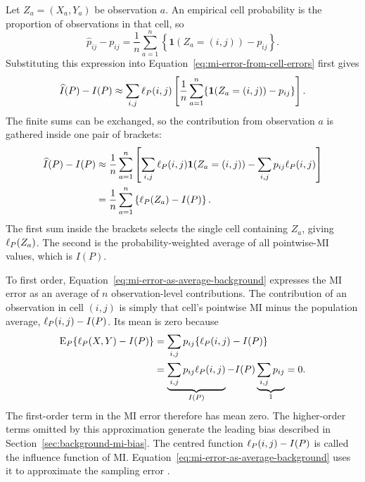 Let \(Z_a=(X_a,Y_a)\) be observation \(a\). An empirical cell probability is
the proportion of observations in that cell, so
\begin{equation}
  \widehat p_{ij}-p_{ij}
  =
  \frac{1}{n}\sum_{a=1}^{n}
  \left\{\mathbf 1(Z_a=(i,j))-p_{ij}\right\}.
  \label{eq:cell-error-as-average}
\end{equation}
Substituting this expression into Equation~\eqref{eq:mi-error-from-cell-errors}
first gives
\begin{equation}
  \widehat I(P)-I(P)
  \approx
  \sum_{i,j}\ell_P(i,j)
  \left[
    \frac{1}{n}\sum_{a=1}^{n}
    \{\mathbf 1(Z_a=(i,j))-p_{ij}\}
  \right].
  \label{eq:mi-error-double-sum-background}
\end{equation}
The finite sums can be exchanged, so the contribution from observation \(a\)
is gathered inside one pair of brackets:
\begin{align}
  \widehat I(P)-I(P)
  &\approx
  \frac{1}{n}\sum_{a=1}^{n}
  \left[
    \sum_{i,j}\ell_P(i,j)\mathbf 1(Z_a=(i,j))
    -\sum_{i,j}p_{ij}\ell_P(i,j)
  \right]
  \notag\\
  &=\frac{1}{n}\sum_{a=1}^{n}
  \left\{\ell_P(Z_a)-I(P)\right\}.
  \label{eq:mi-error-as-average-background}
\end{align}
The first sum inside the brackets selects the single cell containing
\(Z_a\), giving \(\ell_P(Z_a)\). The second is the probability-weighted
average of all pointwise-MI values, which is \(I(P)\).

To first order, Equation~\eqref{eq:mi-error-as-average-background} expresses
the MI error as an average of \(n\) observation-level contributions.
The contribution of an observation in cell \((i,j)\) is simply that cell's
pointwise MI minus the population average, \(\ell_P(i,j)-I(P)\). Its mean is
zero because
\begin{align}
  \operatorname{E}_P\{\ell_P(X,Y)-I(P)\}
  &=\sum_{i,j}p_{ij}\{\ell_P(i,j)-I(P)\}
  \notag\\
  &=\underbrace{\sum_{i,j}p_{ij}\ell_P(i,j)}_{I(P)}
    -I(P)\underbrace{\sum_{i,j}p_{ij}}_{1}
  =0.
  \label{eq:mi-if-mean-zero-background}
\end{align}
The first-order term in the MI error therefore has mean zero. The higher-order
terms omitted by this approximation generate the leading bias described in
Section~\ref{sec:background-mi-bias}.
The centred function \(\ell_P(i,j)-I(P)\) is called the influence function
of MI\@. Equation~\eqref{eq:mi-error-as-average-background} uses it to
approximate the sampling error \citep{hampel1974,vanderVaart1998,kandasamy2015}.

